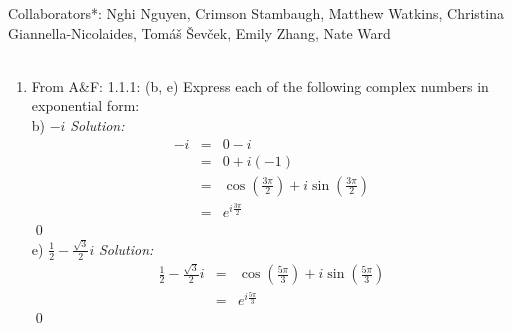 \documentclass[10pt]{amsart}
\theoremstyle{nonumberplain}
\begin{document}
\noindent
Collaborators*: Nghi Nguyen, Crimson Stambaugh, Matthew Watkins, Christina Giannella-Nicolaides, Tomáš Ševček, Emily Zhang, Nate Ward \\
\\
\tiny
{}
\normalsize
\mline
\begin{enumerate}[label={\bf {\arabic*}:}]
\item  From A\&F: 1.1.1: (b, e)
Express each of the following complex numbers in exponential form: \\
b) $-i$
\textit{Solution:}
\begin{eqnarray*}
-i &=& 0 -i \\
   &=& 0 + i(-1) \\
   &=& \cos(\frac{3\pi}{2}) + i \sin(\frac{3\pi}{2}) \\
   &=& e^{i\frac{3\pi}{2}}
\end{eqnarray*}
\qed \\
e) $\frac{1}{2}-\frac{\sqrt{3}}{2}i$
\textit{Solution:}
\begin{eqnarray*}
\frac{1}{2} - \frac{\sqrt{3}}{2}i &=& \cos(\frac{5\pi}{3}) + i \sin(\frac{5\pi}{3}) \\
					    &=& e^{i\frac{5\pi}{3}}
\end{eqnarray*}
\qed \\


\end{enumerate}
\end{document}
